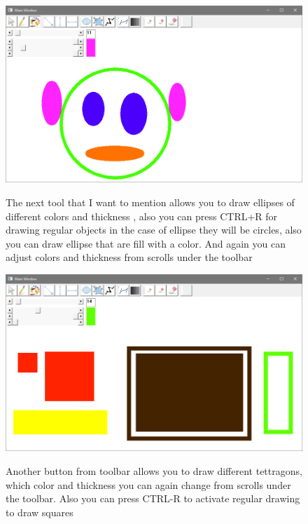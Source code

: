 \begin{figure}[h!]
  \centering
    {%
      \includegraphics[width=1\textwidth]{8}}
  \caption{The next tool that I want to mention allows you to draw ellipses of different colors and thickness , also you can press CTRL+R for drawing regular objects in the case of ellipse they will be circles, also you can draw ellipse that are fill with a color. And again you can adjust colors and thickness from scrolls under the toolbar }
\end{figure}


\begin{figure}[h!]
  \centering
    {%
      \includegraphics[width=1\textwidth]{9}}
  \caption{Another button from toolbar allows you to draw different tettragons, which color and thickness you can again change from scrolls under the toolbar. Also you can press CTRL-R to activate regular drawing to draw squares}
\end{figure}

